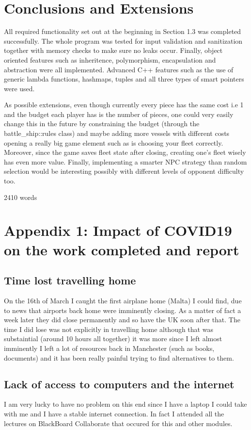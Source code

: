 \documentclass[11pt]{article} %
\begin{document}
\section{Conclusions and Extensions}
All required functionality set out at the beginning in Section 1.3 was completed successfully.
The whole program was tested for input validation and sanitization
together with memory checks to make sure no leaks occur.
Finally, object oriented features such as inheritence, polymorphism,
encapsulation and abstraction were all implemented.
Advanced C++ features such as the use of generic lambda functions, hashmaps,
tuples and all three types of smart pointers were used.
\\
\par As possible extensions, even though currently every piece has the same cost i.e 1 and the budget each player has is the number of pieces,
one could very easily change this in the future by constraining the budget (through the battle\_ship::rules class) and maybe adding more vessels with different costs
opening a really big game element such as is choosing your fleet correctly.
Moreover, since the game saves fleet state after closing, creating one's fleet wisely has even more value.
Finally, implementing a smarter NPC strategy than random selection would be interesting possibly with
different levels of opponent difficulty too.
\\
\par \hfill 2410 words\\
\printbibliography
\newpage
\section*{Appendix 1: Impact of COVID19 on the work completed and report}
\subsection{Time lost travelling home}
On the 16th of March I caught the first airplane home (Malta) I could find, due to news that airports back home were imminently closing.
As a matter of fact a week later they did close permanently and so have the UK soon after that.
The time I did lose was not explicitly in travelling home although that was substaintial (around 10 hours all together)
it was more since I left almost imminently I left a lot of resources back in Manchester (such as books, documents) and it has
been really painful trying to find alternatives to them.
\subsection{Lack of access to computers and the internet}
I am very lucky to have no problem on this end since I have a laptop I could take with me and
I have a stable internet connection.
In fact I attended all the lectures on BlackBoard Collaborate that occured for this and other modules.
\end{document}
